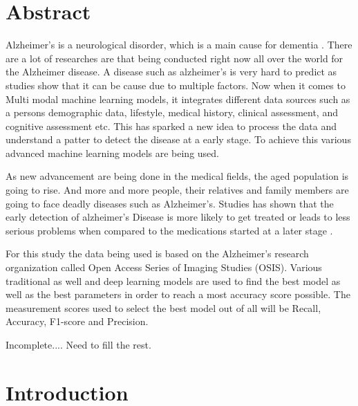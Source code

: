 \documentclass[12pt,twocolumn]{report}
\begin{document}
\chapter*{Abstract}

Alzheimer's is a neurological disorder, which is a main cause for dementia \cite{Ewers2011}. There are a lot of researches are that being conducted right now all over the world for the Alzheimer disease. A disease such as alzheimer's is very hard to predict as studies show that it can be cause due to multiple factors. Now when it comes to Multi modal machine learning models, it integrates different data sources such as a persons demographic data, lifestyle, medical history, clinical assessment, and cognitive assessment etc. This has sparked a new idea to process the data and understand a patter to detect the disease at a early stage. To achieve this various advanced machine learning models are being used.

As new advancement are being done in the medical fields, the aged population is going to rise. And more and more people, their relatives and family members are going to face deadly diseases such as Alzheimer's. Studies has shown that the early detection of alzheimer's Disease is more likely to get treated or leads to less serious problems when compared to the medications started at a later stage \cite{Cummings2024}.

For this study the data being used is based on the Alzheimer's research organization called Open Access Series of Imaging Studies (OSIS). Various traditional as well and deep learning models are used to find the best model as well as the best parameters in order to reach a most accuracy score possible. The measurement scores used to select the best model out of all will be Recall, Accuracy, F1-score and Precision. 

Incomplete.... Need to fill the rest.



\tableofcontents
\listoffigures %
\listoftables  %

\chapter{Introduction}
\end{document}
